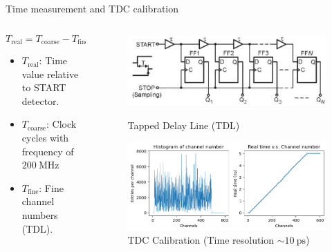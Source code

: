\documentclass{ikpKoeln}
\begin{document}
\begin{frame}[t]{Time measurement and TDC calibration}
\begin{columns}
\begin{column}{0.45 \textwidth}
			\vspace{-0.5em}
			$$T_\text{real} = T_\text{coarse} - T_\text{fine}$$
			\vspace{-1em}
			\small
			{
				\begin{itemize}
					\item $T_\text{real}$: Time value relative to START detector.
					\item $T_\text{coarse}$: Clock cycles with frequency of $\qty{200}{\MHz}$
					\item $T_\text{fine}$: Fine channel numbers (TDL).
				\end{itemize}
			}
		\end{column}
		\begin{column}{0.5 \textwidth}
			\begin{figure}
				\captionsetup{labelformat=empty}
				\vspace{-0.8em}\includegraphics[width = \textwidth]{r3b/TDCFineTime}
				\caption{\scriptsize Tapped Delay Line (TDL)\footnotemark}
				\includegraphics[width = \textwidth]{neuland/FineTimeCal}
				\caption{\scriptsize TDC Calibration (Time resolution $\sim \qty{10}{\pico\second}$)}
			\end{figure}
            \vspace{-1.3em}
            \let\thefootnote\relax{}
		\end{column}
	\end{columns}
\end{frame}
\end{document}
